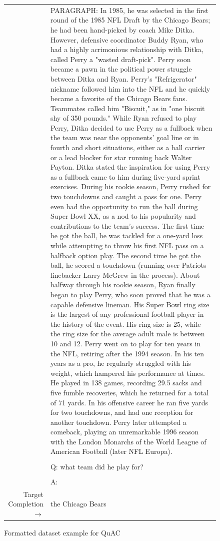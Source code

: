 \begin{figure}
{\begin{tabularx}{\linewidth}{r X}
 & PARAGRAPH: In 1985, he was selected in the first round of the 1985 NFL Draft by the Chicago Bears; he had been hand-picked by coach Mike Ditka. However, defensive coordinator Buddy Ryan, who had a highly acrimonious relationship with Ditka, called Perry a "wasted draft-pick". Perry soon became a pawn in the political power struggle between Ditka and Ryan.  Perry's "Refrigerator" nickname followed him into the NFL and he quickly became a favorite of the Chicago Bears fans. Teammates called him "Biscuit," as in "one biscuit shy of 350 pounds."  While Ryan refused to play Perry, Ditka decided to use Perry as a fullback when the team was near the opponents' goal line or in fourth and short situations, either as a ball carrier or a lead blocker for star running back Walter Payton. Ditka stated the inspiration for using Perry as a fullback came to him during five-yard sprint exercises. During his rookie season, Perry rushed for two touchdowns and caught a pass for one. Perry even had the opportunity to run the ball during Super Bowl XX, as a nod to his popularity and contributions to the team's success. The first time he got the ball, he was tackled for a one-yard loss while attempting to throw his first NFL pass on a halfback option play. The second time he got the ball, he scored a touchdown (running over Patriots linebacker Larry McGrew in the process). About halfway through his rookie season, Ryan finally began to play Perry, who soon proved that he was a capable defensive lineman.  His Super Bowl ring size is the largest of any professional football player in the history of the event. His ring size is 25, while the ring size for the average adult male is between 10 and 12.  Perry went on to play for ten years in the NFL, retiring after the 1994 season. In his ten years as a pro, he regularly struggled with his weight, which hampered his performance at times. He played in 138 games, recording 29.5 sacks and five fumble recoveries, which he returned for a total of 71 yards. In his offensive career he ran five yards for two touchdowns, and had one reception for another touchdown. Perry later attempted a comeback, playing an unremarkable 1996 season with the London Monarchs of the World League of American Football (later NFL Europa). \\ 
 &  \\ 
 & Q: what team did he play for? \\ 
 &  \\ 
 & A: \\ 
 \midrule Target Completion $\to$ & the Chicago Bears \\
\bottomrule \end{tabularx} }  \caption{Formatted dataset example for QuAC}  \label{eval:Quac}  \end{figure}%
